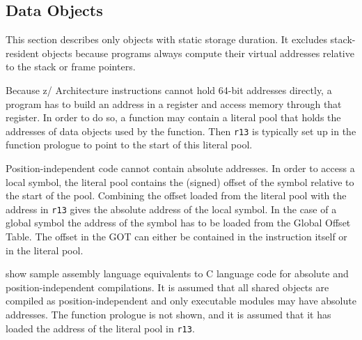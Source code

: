 \documentclass[USenglish,fontsize=11pt,twoside,%
  toc=bib,toc=idx,toc=graduated,numbers=noendperiod,
  bookmarks=true,
  bookmarksnumbered=true,
  bookmarksopen=true,
  bookmarksopenlevel=1,
  breaklinks=true,
  colorlinks=true,
  linkcolor=black,
  pdfpagelayout={TwoPageRight},
  pdfusetitle=true
]{scrreprt}
\newcommand{\ADDRBITS}{64}
\newcommand{\ARCH}{z/\kern-1pt Ar\-chi\-tec\-ture}
\newcommand{\ADDRBITS}{31}
\newcommand{\ARCH}{ESA/390}
\begin{document}
\subsection{Data Objects}
This section describes only objects with static storage duration.  It
excludes stack-resident objects because programs always compute their
virtual addresses relative to the stack or frame pointers.

Because \ARCH{} instructions cannot hold \ADDRBITS{}-bit addresses
directly, a program has to build an address in a register and access
memory through that register.  In order to do so, a function may contain a
literal pool that holds the addresses of data objects used by the
function.  Then \texttt{r13} is typically set up in the function prologue
to point to the start of this literal pool.

Position-independent code cannot contain absolute addresses.  In order
to access a local symbol, the literal pool contains the (signed) offset
of the symbol relative to the start of the pool.  Combining the offset
loaded from the literal pool with the address in \texttt{r13} gives the
absolute address of the local symbol.  In the case of a global symbol
the address of the symbol has to be loaded from the Global Offset
Table.  The offset in the GOT can either be contained in the
instruction itself or in the literal pool.

 show sample assembly
language equivalents to C language code for absolute and
position-independent compilations.  It is assumed that all shared
objects are compiled as position-independent and only executable
modules may have absolute addresses.  The
function prologue is not shown, and it is assumed that it has loaded the
address of the literal pool in \texttt{r13}.
\end{document}
